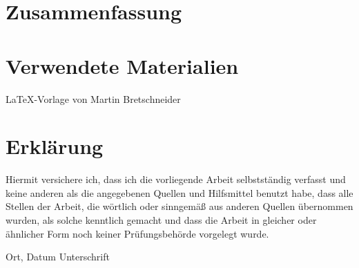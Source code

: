 \chapter{Zusammenfassung}\label{c.zusammenfassung}


\chapter*{Verwendete Materialien}
\LaTeX -Vorlage von Martin Bretschneider \cite{thesislatex}




\chapter*{Erklärung}

Hiermit versichere ich, dass ich die vorliegende Arbeit selbstständig verfasst und keine anderen als die angegebenen Quellen und Hilfsmittel benutzt habe, dass alle Stellen der Arbeit, die wörtlich oder sinngemäß aus anderen Quellen übernommen wurden, als solche kenntlich gemacht und dass die Arbeit in gleicher oder ähnlicher Form noch keiner Prüfungsbehörde vorgelegt wurde.

\vspace{3cm}
Ort, Datum \hspace{5cm} Unterschrift \\


